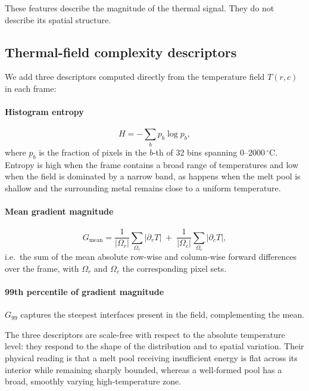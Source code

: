 \documentclass[preprint,12pt]{elsarticle}
\begin{document}
These features describe the magnitude of the thermal signal. They do not describe its spatial structure.

\subsection{Thermal-field complexity descriptors}

We add three descriptors computed directly from the temperature field $T(r,c)$ in each frame:

\paragraph{Histogram entropy}
\begin{equation}
H = -\sum_{b} p_b \log p_b ,
\end{equation}
where $p_b$ is the fraction of pixels in the $b$-th of 32 bins spanning 0--2000\,$^\circ$C. Entropy is high when the frame contains a broad range of temperatures and low when the field is dominated by a narrow band, as happens when the melt pool is shallow and the surrounding metal remains close to a uniform temperature.

\paragraph{Mean gradient magnitude}
\begin{equation}
G_{\mathrm{mean}} = \frac{1}{|\Omega_r|}\sum_{\Omega_r}|\partial_r T| \;+\; \frac{1}{|\Omega_c|}\sum_{\Omega_c}|\partial_c T|,
\end{equation}
i.e.\ the sum of the mean absolute row-wise and column-wise forward differences over the frame, with $\Omega_r$ and $\Omega_c$ the corresponding pixel sets.

\paragraph{99th percentile of gradient magnitude}
$G_{99}$ captures the steepest interfaces present in the field, complementing the mean.

The three descriptors are scale-free with respect to the absolute temperature level: they respond to the shape of the distribution and to spatial variation. Their physical reading is that a melt pool receiving insufficient energy is flat across its interior while remaining sharply bounded, whereas a well-formed pool has a broad, smoothly varying high-temperature zone.
\end{document}
